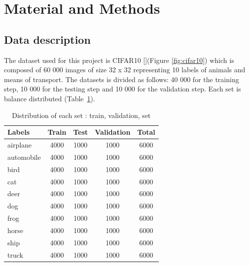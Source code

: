 \documentclass[10pt, a4paper, twocolumn]{article} %
\begin{document}




\section{Material and Methods}

\subsection{Data description}
The dataset used for this project is CIFAR10 [\cite{1}](Figure \ref{fig:cifar10}) which is composed of 60 000 images of size 32 x 32 representing 10 labels of animals and means of transport.  The datasets is divided as follows: 40 000 for the training step, 10 000 for the testing step and 10 000 for the validation step. Each set is balance distributed (Table~\ref{tab1}).
\begin{table}
\begin{tabular}{|l|c|c|c|c|}
  \hline
  Labels & Train & Test & Validation & Total\\
  \hline
  airplane & 4000 & 1000 & 1000 & 6000 \\
  \hline
  automobile & 4000 & 1000 & 1000 & 6000\\
  \hline
  bird & 4000 & 1000 & 1000 & 6000\\
  \hline
  cat & 4000 & 1000 & 1000 & 6000\\
  \hline
  deer & 4000 & 1000 & 1000 & 6000\\
  \hline
  dog & 4000 & 1000 & 1000 & 6000\\
  \hline
  frog & 4000 & 1000 & 1000 & 6000\\
  \hline
  horse & 4000 & 1000 & 1000 & 6000\\
  \hline
  ship & 4000 & 1000 & 1000 & 6000 \\
  \hline
  truck & 4000 & 1000 & 1000 & 6000\\
  \hline
\end{tabular}
\caption{\label{tab1} Distribution of each set : train, validation, set}
\end{table}
\end{document}

